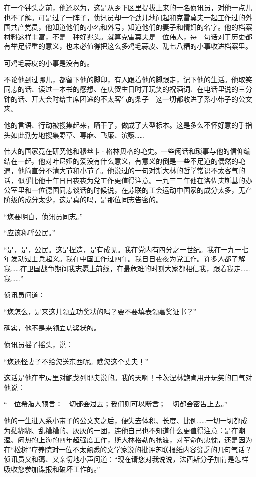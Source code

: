 在一个钟头之前，他还以为，这是从乡下区里提拔上来的一名侦讯员，对他一点儿也不了解。可是过了一阵子，侦讯员却一个劲儿地问起和克雷莫夫一起工作过的外国共产党员，他知道他们的小名和外号，知道他们的妻子和情妇的名字。他的档案材料这样丰富，不是一种好兆头。就算克雷莫夫是一位伟人，每一句话对于历史都有举足轻重的意义，也未必值得把这么多鸡毛蒜皮、乱七八糟的小事收进档案里。

可鸡毛蒜皮的小事是没有的。

不论他到过哪儿，都留下他的脚印，有人跟着他的脚跟走，记下他的生活。他取笑同志的话、读过一本书的感想、在庆贺生日时开玩笑的祝酒词、在电话里说的三分钟的话、开大会时给主席团递的不太客气的条子—这一切都收进了系小带子的公文夹。

他的言语、行动被搜集起来，晒干了，做成了大型标本。这是多么不怀好意的手指头如此勤劳地搜集野草、荨麻、飞廉、滨藜……

伟大的国家竟在研究他和穆丝卡·格林贝格的艳史。一些闲话和琐事与他的信仰编结在一起，他对叶尼娅的爱没有什么意义，有意义的倒是一些不足道的偶然的艳遇，他简直分不清大节和小节了。他说过的一句对斯大林的哲学常识不太客气的话，似乎比他十年日日夜夜为党工作更值得注意。一九三二年他在洛佐夫斯基的办公室里和一位德国同志谈话的时候说，在苏联的工会运动中国家的成分太多，无产阶级的成分太少，这是真的吗，是那位同志告密的。

“您要明白，侦讯员同志。”

“应该称呼公民。”

“是，是，公民。这是捏造，是有成见。我在党内有四分之一世纪。我在一九一七年发动过士兵起义。我在中国工作过四年。我日日夜夜为党工作。许多人都了解我……在卫国战争期间我志愿上前线，在最危难的时刻大家都相信我，跟着我走……我……”

侦讯员问道：

“您怎么，是来这儿领立功奖状的吗？要不要填表领嘉奖证书？”

确实，他不是来领立功奖状的。

侦讯员摇了摇头，说：

“您还怪妻子不给您送东西呢。瞧您这个丈夫！”

这话是他在牢房里对鲍戈列耶夫说的。我的天啊！卡茨涅林鲍肯用开玩笑的口气对他说：

“一位希腊人预言：一切都会过去；我们则可以断言；一切都会密告上去。”

他的一生进入系小带子的公文夹之后，便失去体积、长度、比例……一切一切都成为黏糊糊、乱糟糟的、灰灰的一团，连他自己也不知道什么更值得注意：是在潮湿、闷热的上海的四年超强度工作，斯大林格勒的抢渡，对革命的忠忱，还是因为在“松树”疗养院对一位不太熟悉的文学家说的批评苏联报纸内容贫乏的几句气话？侦讯员又和蔼、又亲切地小声问道：“现在请您对我说说，法西斯分子加肯是怎样吸收您参加谍报和破坏工作的。”

